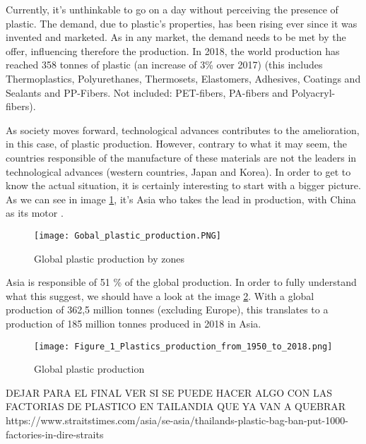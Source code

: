 \documentclass[twoside,a4paper,12pt]{report}
\begin{document}
Currently, it's unthinkable to go on a day without perceiving the presence of plastic. The demand, due to plastic's properties, has been rising ever since it was invented and marketed.
As in any market, the demand needs to be met by the offer, influencing therefore the production. In 2018, the  world production has reached 358 tonnes of plastic (an increase of 3\% over 2017)\cite{Plas19} (this includes Thermoplastics, Polyurethanes, Thermosets, Elastomers, Adhesives, Coatings and Sealants
and PP-Fibers. Not included: PET-fibers, PA-fibers and Polyacryl-fibers).

As society moves forward, technological advances contributes to the amelioration, in this case, of plastic production. However, contrary to what it may seem, the countries responsible of the manufacture of these materials are not the leaders in technological advances (western countries, Japan and Korea). In order to get to know the actual situation, it is certainly interesting to start with a bigger picture. As we can see in image \ref{fig:Gloplastproduction}, it's Asia who takes the lead in production, with China as its motor \cite{Plas19}.


\begin{figure}
     \centering
     \texttt{[image: Gobal\_plastic\_production.PNG]}
     \caption{Global plastic production by zones}\cite{Plas19}
      \label{fig:Gloplastproduction}
\end{figure}

Asia is responsible of 51 \% of the global production. In order to fully understand what this suggest, we should have a look at the image \ref{fig:glo_plast_prod}. With a global production of 362,5 million tonnes (excluding Europe)\cite{PlasResinProd}, this translates to a production of 185 million tonnes produced in 2018 in Asia. 

\begin{figure}
    \centering
    \texttt{[image: Figure\_1\_Plastics\_production\_from\_1950\_to\_2018.png]}
    \caption{Global plastic production}\cite{PlasResinProd}
     \label{fig:glo_plast_prod}
\end{figure}




 DEJAR PARA EL FINAL VER SI SE PUEDE HACER ALGO CON LAS FACTORIAS DE PLASTICO EN TAILANDIA QUE YA VAN A QUEBRAR https://www.straitstimes.com/asia/se-asia/thailands-plastic-bag-ban-put-1000-factories-in-dire-straits
\end{document}
